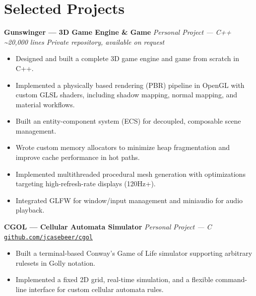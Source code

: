 \documentclass[11pt, letterpaper]{article}
\begin{document}
\section{Selected Projects}

\noindent\textbf{Gunswinger --- 3D Game Engine \& Game} \hfill \textit{Personal Project --- C++}\\
\textit{\textasciitilde20,000 lines \quad\textbar\quad Private repository, available on request}\\[4pt]
\begin{itemize}
  \item Designed and built a complete 3D game engine and game from scratch in C++.
  \item Implemented a physically based rendering (PBR) pipeline in OpenGL with custom GLSL shaders, including shadow mapping, normal mapping, and material workflows.
  \item Built an entity-component system (ECS) for decoupled, composable scene management.
  \item Wrote custom memory allocators to minimize heap fragmentation and improve cache performance in hot paths.
  \item Implemented multithreaded procedural mesh generation with optimizations targeting high-refresh-rate displays (120Hz+).
  \item Integrated GLFW for window/input management and miniaudio for audio playback.
\end{itemize}

\vspace{6pt}

\noindent\textbf{CGOL --- Cellular Automata Simulator} \hfill \textit{Personal Project --- C}\\
\href{https://github.com/jcasebeer/cgol}{\small\texttt{github.com/jcasebeer/cgol}}\\[4pt]
\begin{itemize}
  \item Built a terminal-based Conway's Game of Life simulator supporting arbitrary rulesets in Golly notation.
  \item Implemented a fixed 2D grid, real-time simulation, and a flexible command-line interface for custom cellular automata rules.
\end{itemize}

\vspace{6pt}
\end{document}
